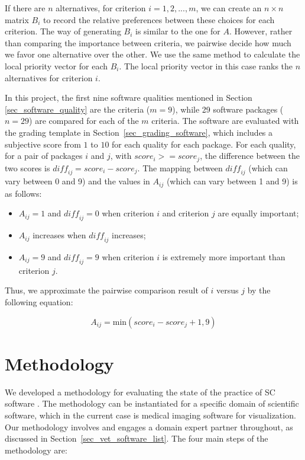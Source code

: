 \documentclass[final, 3p, times, authoryear]{elsarticle}
\begin{document}
If there are $n$ alternatives, for criterion $i = 1, 2, ... , m$, we can create
an $n\times n$ matrix $B_i$ to record the relative preferences between these
choices for each criterion. The way of generating $B_i$ is similar to the one
for $A$. However, rather than comparing the importance between criteria, we
pairwise decide how much we favor one alternative over the other. We use the
same method to calculate the local priority vector for each $B_i$.  The local
priority vector in this case ranks the $n$ alternatives for criterion $i$.

In this project, the first nine software qualities mentioned in Section
\ref{sec_software_quality} are the criteria ($m = 9$), while 29 software
packages ($n = 29$) are compared for each of the $m$ criteria. The software are
evaluated with the grading template in Section~\ref{sec_grading_software}, which
includes a subjective score from $1$ to $10$ for each quality for each package.
For each quality, for a pair of packages $i$ and $j$, with $\mathit{score}_i >=
\mathit{score}_j$, the difference between the two scores is $\mathit{diff_{ij}}
= \mathit{score}_i - \mathit{score}_j$. The mapping between $\mathit{diff_{ij}}$
(which can vary between 0 and 9) and the values in $A_{ij}$ (which can vary
between 1 and 9) is as follows:

\begin{itemize}
\item $A_{ij} = 1$ and $\mathit{diff_{ij}} = 0$ when criterion $i$ and criterion
$j$ are equally important;
\item $A_{ij}$ increases when $\mathit{diff_{ij}}$ increases;
\item $A_{ij} = 9$ and $\mathit{diff_{ij}} = 9$ when criterion $i$ is extremely
more important than criterion $j$.
\end{itemize}

\noindent Thus, we approximate the pairwise comparison result of $i$ versus $j$
by the following equation:

\begin{equation}
A_{ij} = \text{min}(\mathit{score}_i - \mathit{score}_j + 1, 9)
\end{equation}

\section{Methodology} \label{ch_methods}

We developed a methodology for evaluating the state of the practice of SC
software \citep{SmithEtAl2021}.  The  methodology can be instantiated for a
specific domain of scientific software, which in the current case is medical
imaging software for visualization.  Our methodology involves and engages a
domain expert partner throughout, as discussed in
Section~\ref{sec_vet_software_list}.  The four main steps of the methodology are:
\end{document}
